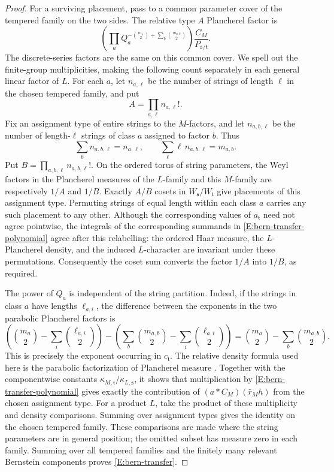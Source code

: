 \documentclass[11pt,a4paper]{amsart}
\theoremstyle{definition}
\theoremstyle{remark}
\newcommand{\grs}{\mathfrak s}
\newcommand{\grt}{\mathfrak t}
\begin{document}
\begin{proof}
For a surviving placement, pass to a common parameter cover of the
tempered family on the two sides. The relative type $A$ Plancherel
factor is
$$
 \left(\prod_a
 Q_a^{-\binom{m_a}{2}+\sum_b\binom{m_{a,b}}{2}}\right)
 \frac{C_M}{P_{\grs/\grt}}.
$$
The discrete-series factors are the same on this common cover.
We spell out the finite-group multiplicities, making the following
count separately in each general linear factor of $L$.
For each $a$, let $n_{a,\ell}$ be the number of strings of length
$\ell$ in the chosen tempered family, and put
$$
 A=\prod_{a,\ell}n_{a,\ell}!.
$$
Fix an assignment type of entire strings to the $M$-factors, and let
$n_{a,b,\ell}$ be the number of length-$\ell$ strings of class $a$
assigned to factor $b$. Thus
$$
 \sum_b n_{a,b,\ell}=n_{a,\ell},
 \qquad
 \sum_\ell \ell\,n_{a,b,\ell}=m_{a,b}.
$$
Put $B=\prod_{a,b,\ell}n_{a,b,\ell}!$. On the ordered torus of
string parameters, the Weyl factors in the Plancherel measures of
the $L$-family and this $M$-family are respectively $1/A$ and $1/B$.
Exactly $A/B$ cosets in $W_\grs/W_\grt$ give placements of this
assignment type. Permuting strings of equal length within each
class $a$ carries any such placement to any other. Although the
corresponding values of $a_\grt$ need not agree pointwise, the
integrals of the corresponding summands in
\eqref{E:bern-transfer-polynomial} agree after this relabelling:
the ordered Haar measure, the $L$-Plancherel density, and the
induced $L$-character are invariant under these permutations.
Consequently the coset sum converts the factor $1/A$ into $1/B$,
as required.

The power of $Q_a$ is independent of the string partition.
Indeed, if the strings in class $a$ have lengths $\ell_{a,i}$,
the difference between the exponents in the two parabolic
Plancherel factors is
$$
 \left(\binom{m_a}{2}
       -\sum_i\binom{\ell_{a,i}}{2}\right)
 -
 \left(\sum_b\binom{m_{a,b}}{2}
       -\sum_i\binom{\ell_{a,i}}{2}\right)
 =
 \binom{m_a}{2}-\sum_b\binom{m_{a,b}}{2}.
$$
This is precisely the exponent occurring in $c_\grt$.
The relative density formula used here is the parabolic
factorization of Plancherel measure
\cite[Proposition 3.27 and formula (4.96)]{Opdam}.
Together with the componentwise constants
$\kappa_{M,\grt}/\kappa_{L,\grs}$, it shows that multiplication by
\eqref{E:bern-transfer-polynomial} gives exactly the contribution
of $(a*C_M)(\bar r_Mh)$ from the chosen assignment type.
For a product $L$, take the product of these multiplicity and
density comparisons. Summing over assignment types gives the
identity on the chosen tempered family. These comparisons are
made where the string parameters are in general position;
the omitted subset has measure zero in each family. Summing
over all tempered families and the finitely many relevant
Bernstein components proves \eqref{E:bern-transfer}.
\end{proof}
\end{document}
